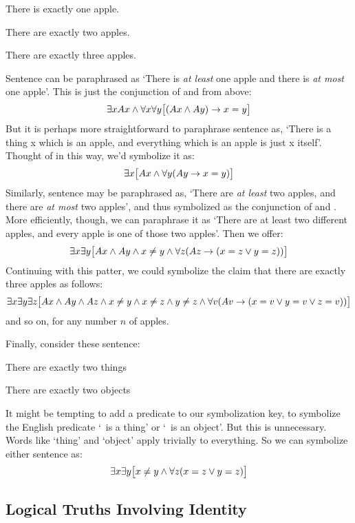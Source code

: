 \begin{earg}
\item[\ex{exactly1}] There is exactly one apple.
\item[\ex{exactly2}] There are exactly two apples.
\item[\ex{exactly3}] There are exactly three apples.
\end{earg}
Sentence  can be paraphrased as `There is \emph{at least} one apple and there is \emph{at most} one apple'. This is just the conjunction of  and   from above:
$$\exists x Ax \wedge \forall x\forall y\bigl[(Ax \wedge Ay) \rightarrow x=y\bigr]$$
But it is perhaps more straightforward to paraphrase sentence  as, `There is a thing x which is an apple, and everything which is an apple is just x itself'. Thought of in this way, we'd symbolize it as:
$$\exists x\bigl[Ax \wedge \forall y(Ay \rightarrow x= y)\bigr]$$
Similarly, sentence  may be paraphrased as, `There are \emph{at least} two apples, and there are \emph{at most} two apples', and thus symbolized as the conjunction of  and .
More efficiently, though, we can paraphrase it as `There are at least two different apples, and every apple is one of those two apples'. Then we offer:
$$\exists x\exists y\bigl[Ax \wedge Ay \wedge x \neq y \wedge \forall z(Az \rightarrow ( x= z \vee y = z))\bigr]$$
Continuing with this patter, we could symbolize the claim that there are exactly three apples as follows:
$$\exists x \exists y \exists z\bigl[Ax \wedge Ay \wedge Az \wedge x \neq y \wedge x \neq z \wedge y \neq z \wedge \forall v(Av \rightarrow (x = v \vee y = v \vee z = v))\bigr]$$
and so on, for any number $n$ of apples.

Finally, consider these sentence:
\begin{earg}
\item[\ex{exactly2things}] There are exactly two things
\item[\ex{exactly2objects}] There are exactly two objects
\end{earg}
It might be tempting to add a predicate to our symbolization key, to symbolize the English predicate `\blank\ is a thing' or `\blank\ is an object'. But this is unnecessary. Words like `thing' and `object' apply trivially to everything. So we can symbolize either sentence as:
		$$\exists x \exists y \bigl[x \neq y \wedge \forall z(x=z \vee y = z)\bigr]$$

\subsection{Logical Truths Involving Identity}\label{s:LogicalTruthsID}

